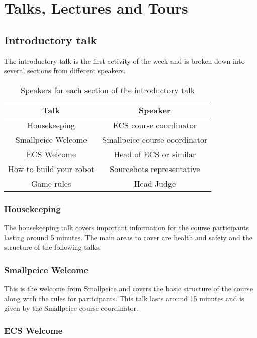 \section{Talks, Lectures and Tours}

\subsection{Introductory talk}

The introductory talk is the first activity of the week and is broken down into several sections from different speakers.

\begin{table}[h]
    \centering
    \begin{tabular}{cc}
        Talk & Speaker \\
        \hline
        Housekeeping & ECS course coordinator \\
        Smallpeice Welcome &  Smallpeice course coordinator \\
        ECS Welcome & Head of ECS or similar \\
        How to build your robot & Sourcebots representative \\
        Game rules & Head Judge \\
    \end{tabular}
    \label{tab:introspeakers}
    \caption{Speakers for each section of the introductory talk}
\end{table}

\subsubsection{Housekeeping}

The housekeeping talk covers important information for the course participants lasting around 5 minutes.
The main areas to cover are health and safety and the structure of the following talks.

\subsubsection{Smallpeice Welcome}

This is the welcome from Smallpeice and covers the basic structure of the course along with the rules for participants.
This talk lasts around 15 minutes and is given by the Smallpeice course coordinator.

\subsubsection{ECS Welcome}

